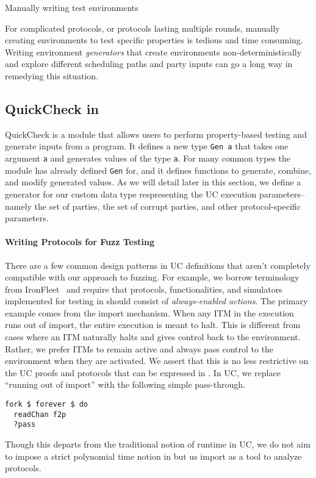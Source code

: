 Manually writing test environments

For complicated protocols, or protocols lasting multiple rounds, manually creating environments to test specific properties is tedious and time consuming.
Writing environment \emph{generators} that create environments non-deterministically and explore different scheduling paths and party inputs can go a long way in remedying this situation.




\subsection{QuickCheck in \us}
QuickCheck is a module that allows users to perform property-based testing and generate inputs from a program.
It defines a new type \texttt{Gen a} that takes one argument \texttt{a} and generates values of the type \texttt{a}.
For many common types the module has already defined \texttt{Gen} for, and it defines functions to generate, combine, and modify generated values. 
As we will detail later in this section, we define a generator for our custom data type respresenting the UC execution parameters--namely the set of parties, the set of corrupt parties, and other protocol-specific parameters.


\paragraph{Writing Protocols for Fuzz Testing}
There are a few common design patterns in UC definitions that aren't completely compatible with our approach to fuzzing.
For example, we borrow terminology from IronFleet~\cite{ironfleet} and require that protocols, functionalities, and simulators implemented for testing in \us should consist of \emph{always-enabled actions}.
The primary example comes from the import mechanism. When any ITM in the execution runs out of import, the entire execution is meant to halt.
This is different from cases where an ITM naturally halts and gives control back to the environment.
Rather, we prefer ITMs to remain active and always pass control to the environment when they are activated. 
We assert that this is no less restrictive on the UC proofs and protocols that can be expressed in \us.
In UC, we replace ``running out of import'' with the following simple pass-through.
\begin{lstlisting}
fork $ forever $ do
  readChan f2p
  ?pass
\end{lstlisting}
Though this departs from the traditional notion of runtime in UC, we do not aim to impose a strict polynomial time notion in \us
but us import as a tool to analyze protocols.

